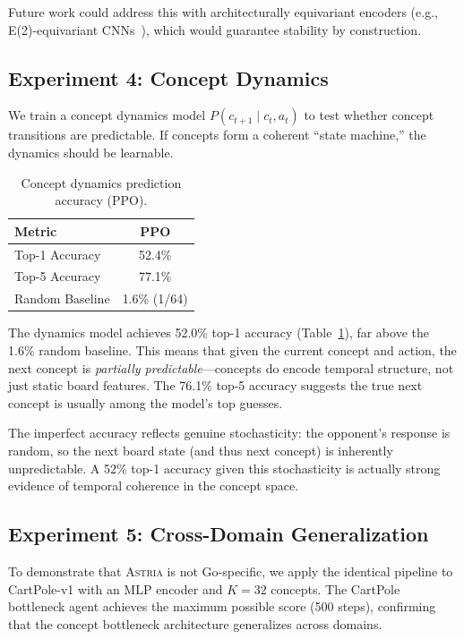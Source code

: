 \documentclass[11pt,a4paper]{article}
\newcommand{\astria}{\textsc{Astria}}
\begin{document}
Future work could address this with architecturally equivariant encoders (e.g., E(2)-equivariant CNNs~\citep{cohen2016group}), which would guarantee stability by construction.

\subsection{Experiment 4: Concept Dynamics}
\label{sec:dynamics}

We train a concept dynamics model $P(c_{t+1} \mid c_t, a_t)$ to test whether concept transitions are predictable. If concepts form a coherent ``state machine,'' the dynamics should be learnable.

\begin{table}[t]
\centering
\caption{Concept dynamics prediction accuracy (PPO).}
\label{tab:dynamics}
\begin{tabular}{lc}
\toprule
\textbf{Metric} & \textbf{PPO} \\
\midrule
Top-1 Accuracy & 52.4\% \\
Top-5 Accuracy & 77.1\% \\
Random Baseline & 1.6\% (1/64) \\
\bottomrule
\end{tabular}
\end{table}

The dynamics model achieves 52.0\% top-1 accuracy (Table~\ref{tab:dynamics}), far above the 1.6\% random baseline. This means that given the current concept and action, the next concept is \emph{partially predictable}---concepts do encode temporal structure, not just static board features. The 76.1\% top-5 accuracy suggests the true next concept is usually among the model's top guesses.

The imperfect accuracy reflects genuine stochasticity: the opponent's response is random, so the next board state (and thus next concept) is inherently unpredictable. A 52\% top-1 accuracy given this stochasticity is actually strong evidence of temporal coherence in the concept space.

\subsection{Experiment 5: Cross-Domain Generalization}
\label{sec:cartpole}

To demonstrate that \astria{} is not Go-specific, we apply the identical pipeline to CartPole-v1 with an MLP encoder and $K=32$ concepts. The CartPole bottleneck agent achieves the maximum possible score (500 steps), confirming that the concept bottleneck architecture generalizes across domains.
\end{document}
